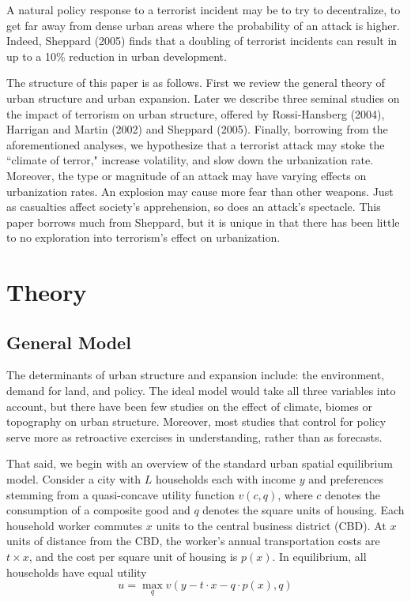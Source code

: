 \documentclass[preprint,2p,12pt]{elsarticle}
\begin{document}
A natural policy response to a terrorist incident may be to try to decentralize, to get far away from dense urban areas where the probability of an attack is higher.
Indeed, Sheppard (2005) finds that a doubling of terrorist incidents can result in up to a 10\% reduction in urban development.

The structure of this paper is as follows.
First we review the general theory of urban structure and urban expansion.
Later we describe three seminal studies on the impact of terrorism on urban structure, offered by Rossi-Hansberg (2004), Harrigan and Martin (2002) and Sheppard (2005).
Finally, borrowing from the aforementioned analyses, we hypothesize that a terrorist attack may stoke the ``climate of terror," increase volatility, and slow down the urbanization rate.
Moreover, the type or magnitude of an attack may have varying effects on urbanization rates. An explosion may cause more fear than other weapons. Just as casualties affect society's apprehension, so does an attack's spectacle. This paper borrows much from Sheppard, but it is unique in that there has been little to no exploration into terrorism's effect on urbanization.


\section{\sc Theory}

\subsection{\sc General Model}
The determinants of urban structure and expansion include: the environment, demand for land, and policy.
The ideal model would take all three variables into account, but there have been few studies on the effect of climate, biomes or topography on urban structure.
Moreover, most studies that control for policy serve more as retroactive exercises in understanding, rather than as forecasts.

That said, we begin with an overview of the standard urban spatial equilibrium model.
Consider a city with $L$ households each with income $y$ and preferences stemming from a quasi-concave utility function $v(c,q)$, where $c$ denotes the consumption of a composite good and $q$ denotes the square units of housing.
Each household worker commutes $x$ units to the central business district (CBD).
At $x$ units of distance from the CBD, the worker's annual transportation costs are $t \times x$, and the cost per square unit of housing is $p(x)$.
In equilibrium, all households have equal utility 
$$
u = \max_{q} v(y - t \cdot x - q \cdot p(x), q)
$$
  
\end{document}
